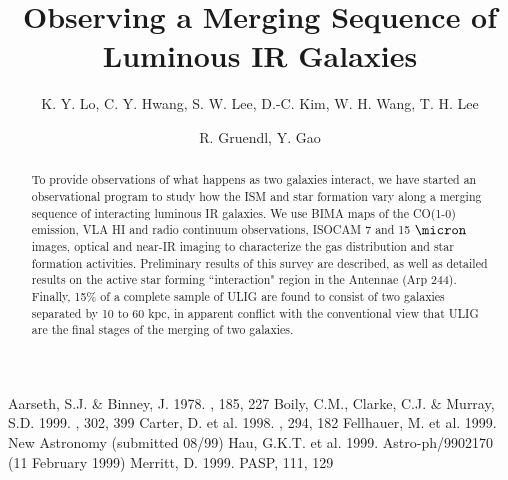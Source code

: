 {{{{{{{{{{{{{{\begin{references}
\begin{references}

 Aarseth, S.J. \& Binney, J. 1978. \mnras, 185, 227
 Boily, C.M., Clarke,  C.J. \& Murray, S.D.  1999. \mnras,
302, 399 \label{BCM}
 Carter, D. et al. 1998. \mnras, 294, 182 \label{carter1998}
 Fellhauer, M. et al. 1999. New Astronomy (submitted 08/99) \label{fellhauer}
 Hau, G.K.T. et al. 1999. Astro-ph/9902170 (11 February 1999) \label{hau}
 Merritt, D. 1999. PASP, 111, 129 \label{merritt}

\end{references}




\title{Observing a Merging Sequence of Luminous IR Galaxies}

\author{K. Y. Lo, C. Y. Hwang,
S. W. Lee, D.-C. Kim, W. H. Wang, T. H. Lee}

\author{R. Gruendl, Y. Gao}

\begin{abstract}

To provide observations of what happens as two galaxies interact, we
have started an observational program to study how the ISM and star
formation vary along a merging sequence of interacting luminous IR
galaxies.  We use BIMA maps of the CO(1-0) emission, VLA HI and radio
continuum observations, ISOCAM 7 and 15 $\micron$ images, optical and
near-IR imaging to characterize the gas distribution and star
formation activities.  Preliminary results of this survey are
described, as well as detailed results on the active star forming
``interaction" region in the Antennae (Arp 244).  Finally, 15\% of a
complete sample of ULIG are found to consist of two galaxies separated
by 10 to 60 kpc, in apparent conflict with the conventional view that
ULIG are the final stages of the merging of two galaxies.

\end{abstract}



\end{references}}}}}}}}}}}}}}}
